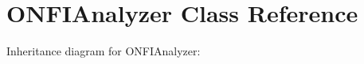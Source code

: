 \hypertarget{classONFIAnalyzer}{}\section{O\+N\+F\+I\+Analyzer Class Reference}
\label{classONFIAnalyzer}


Inheritance diagram for O\+N\+F\+I\+Analyzer\+:

